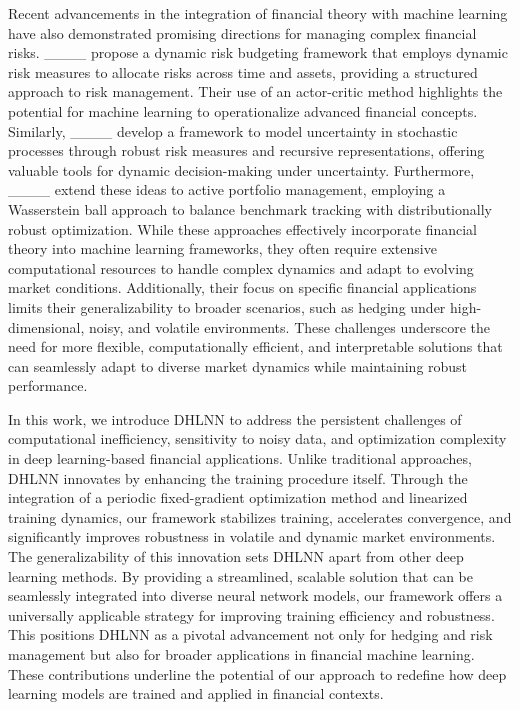 Recent advancements in the integration of financial theory with machine learning have also demonstrated promising directions for managing complex financial risks.  ____ propose a dynamic risk budgeting framework that employs dynamic risk measures to allocate risks across time and assets, providing a structured approach to risk management. Their use of an actor-critic method highlights the potential for machine learning to operationalize advanced financial concepts. Similarly, ____ develop a framework to model uncertainty in stochastic processes through robust risk measures and recursive representations, offering valuable tools for dynamic decision-making under uncertainty. Furthermore, ____ extend these ideas to active portfolio management, employing a Wasserstein ball approach to balance benchmark tracking with distributionally robust optimization. While these approaches effectively incorporate financial theory into machine learning frameworks, they often  require extensive computational resources to handle complex dynamics and adapt to evolving market conditions. Additionally, their focus on specific financial applications limits their generalizability to broader scenarios, such as hedging under high-dimensional, noisy, and volatile environments. These challenges underscore the need for more flexible, computationally efficient, and interpretable solutions that can seamlessly adapt to diverse market dynamics while maintaining robust performance. 


In this work, we introduce DHLNN to address the persistent challenges of computational inefficiency, sensitivity to noisy data, and optimization complexity in deep learning-based financial applications. Unlike traditional approaches, DHLNN innovates by enhancing the training procedure itself. Through the integration of a periodic fixed-gradient optimization method and linearized training dynamics, our framework stabilizes training, accelerates convergence, and significantly improves robustness in volatile and dynamic market environments.
The generalizability of this innovation sets DHLNN apart from other deep learning methods. By providing a streamlined, scalable solution that can be seamlessly integrated into diverse neural network models, our framework offers a universally applicable strategy for improving training efficiency and robustness. This positions DHLNN as a pivotal advancement not only for hedging and risk management but also for broader applications in financial machine learning. These contributions underline the potential of our approach to redefine how deep learning models are trained and applied in financial contexts.